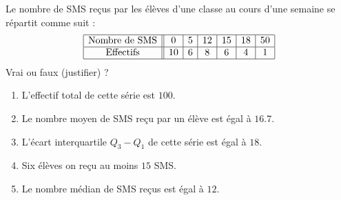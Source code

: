 
\begin{exercice}\label{exosmath-0530}

    Le nombre de SMS reçus par les élèves d'une classe au cours d'une semaine se répartit comme suit :
    \begin{equation*}
        \begin{array}[]{|c||c|c|c|c|c|c|}
            \hline
            \text{Nombre de SMS}&0&5&12&15&18&50\\
            \hline
            \text{Effectifs}&10&6&8&6&4&1\\
            \hline
        \end{array}
    \end{equation*}
    Vrai ou faux (justifier) ?
    \begin{enumerate}
        \item
            L'effectif total de cette série est \( 100\).
        \item
            Le nombre moyen de SMS reçu par un élève est égal à \( 16.7\).
        \item
            L'écart interquartile \( Q_3-Q_1\) de cette série est égal à \( 18\).
        \item
            Six élèves on reçu au moins \( 15\) SMS.
        \item
            Le nombre médian de SMS reçus est égal à \( 12\).
    \end{enumerate}

\end{exercice}
